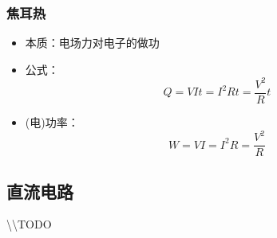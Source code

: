 \subsubsection{焦耳热}

\begin{itemize}
    \item 本质：电场力对电子的做功
    \item 公式：
    \begin{equation*}
        Q=VIt=I^2Rt=\frac{V^2}{R}t
    \end{equation*}
    \item (电)功率：
    \begin{equation*}
        W=VI=I^2R=\frac{V^2}{R}
    \end{equation*}
\end{itemize}

\subsection{直流电路}

\textbackslash\textbackslash TODO
